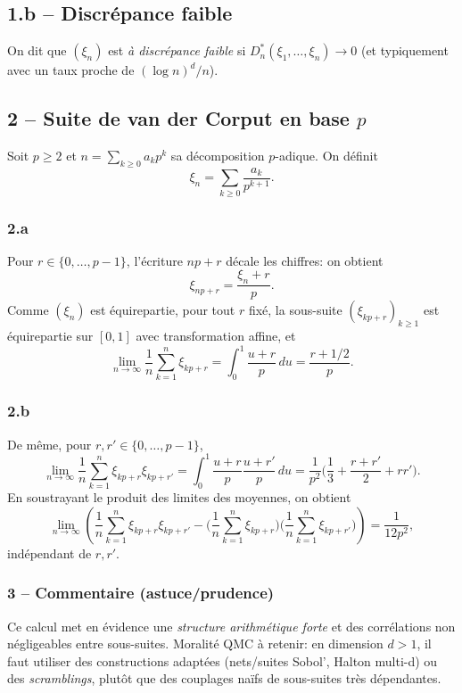 \documentclass[11pt,a4paper]{article}
\newcommand{\1}{\mathbbm{1}}
\theoremstyle{plain}
\theoremstyle{definition}
\begin{document}
\subsection{1.b -- Discrépance faible}
On dit que $(\xi_n)$ est \emph{à discrépance faible} si $D_n^*(\xi_1,\dots,\xi_n)\to 0$ (et typiquement avec un taux proche de $(\log n)^d/n$).

\subsection{2 -- Suite de van der Corput en base $p$}
Soit $p\ge2$ et $n=\sum_{k\ge 0} a_k p^k$ sa décomposition $p$-adique.
On définit
\[
\xi_n=\sum_{k\ge0}\frac{a_k}{p^{k+1}}.
\]
\subsubsection{2.a}
Pour $r\in\{0,\dots,p-1\}$, l'écriture $np+r$ décale les chiffres: on obtient
\[
\xi_{np+r}=\frac{\xi_n+r}{p}.
\]
Comme $(\xi_n)$ est équirepartie, pour tout $r$ fixé, la sous-suite $(\xi_{kp+r})_{k\ge1}$ est équirepartie sur $[0,1]$ avec transformation affine, et
\[
\lim_{n\to\infty}\frac1n\sum_{k=1}^n \xi_{kp+r}
=\int_0^1 \frac{u+r}{p}\,du
=\frac{r+1/2}{p}.
\]
\subsubsection{2.b}
De même, pour $r,r'\in\{0,\dots,p-1\}$,
\[
\lim_{n\to\infty}\frac1n\sum_{k=1}^n \xi_{kp+r}\xi_{kp+r'}
=\int_0^1 \frac{u+r}{p}\frac{u+r'}{p}\,du
=\frac{1}{p^2}\Big(\frac13+\frac{r+r'}{2}+rr'\Big).
\]
En soustrayant le produit des limites des moyennes, on obtient
\[
\lim_{n\to\infty}\left(\frac1n\sum_{k=1}^n \xi_{kp+r}\xi_{kp+r'}-\Big(\frac1n\sum_{k=1}^n \xi_{kp+r}\Big)\Big(\frac1n\sum_{k=1}^n \xi_{kp+r'}\Big)\right)
=\frac{1}{12p^2},
\]
indépendant de $r,r'$.

\subsubsection{3 -- Commentaire (astuce/prudence)}
Ce calcul met en évidence une \emph{structure arithmétique forte} et des corrélations non négligeables entre sous-suites.
Moralité QMC à retenir: en dimension $d>1$, il faut utiliser des constructions adaptées (nets/suites Sobol', Halton multi-d) ou des \emph{scramblings}, plutôt que des couplages naïfs de sous-suites très dépendantes.
\end{document}
